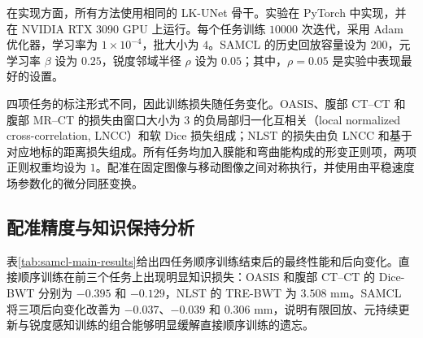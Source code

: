在实现方面，所有方法使用相同的 LK-UNet 骨干。实验在 PyTorch 中实现，并在 NVIDIA RTX 3090 GPU 上运行。每个任务训练 $10000$ 次迭代，采用 Adam 优化器\cite{kingma2015adam}，学习率为 $1\times10^{-4}$，批大小为 $4$。SAMCL 的历史回放容量设为 $200$，元学习率 $\beta$ 设为 $0.25$，锐度邻域半径 $\rho$ 设为 $0.05$；其中，$\rho=0.05$ 是实验中表现最好的设置。

四项任务的标注形式不同，因此训练损失随任务变化。OASIS、腹部 CT--CT 和腹部 MR--CT 的损失由窗口大小为 $3$ 的负局部归一化互相关（local normalized cross-correlation, LNCC）和软 Dice 损失组成\cite{avants2008syn,hu2018weakreg}；NLST 的损失由负 LNCC 和基于对应地标的距离损失组成。所有任务均加入膜能和弯曲能构成的形变正则项，两项正则权重均设为 $1$。配准在固定图像与移动图像之间对称执行，并使用由平稳速度场参数化的微分同胚变换。

\subsection{配准精度与知识保持分析}
\label{subsubsec:samcl-analysis}

表\ref{tab:samcl-main-results}给出四任务顺序训练结束后的最终性能和后向变化。直接顺序训练在前三个任务上出现明显知识损失：OASIS 和腹部 CT--CT 的 Dice-BWT 分别为 $-0.395$ 和 $-0.129$，NLST 的 TRE-BWT 为 $3.508$ mm。SAMCL 将三项后向变化改善为 $-0.037$、$-0.039$ 和 $0.306$ mm，说明有限回放、元持续更新与锐度感知训练的组合能够明显缓解直接顺序训练的遗忘。


